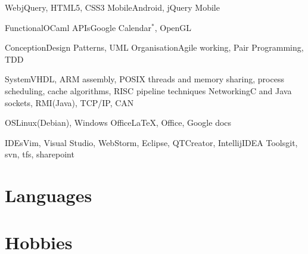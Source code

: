 \documentclass[a4paper,11pt]{moderncv}
\begin{document}
\cvdoubleitem
{Web}{jQuery, HTML5, CSS3}
{Mobile}{Android, jQuery Mobile}

\cvdoubleitem
{Functional}{OCaml}
{APIs}{Google Calendar$^*$, OpenGL}

\cvdoubleitem
{Conception}{Design Patterns, UML}
{Organisation}{Agile working, Pair Programming, TDD}

\cvdoubleitem
{System}{VHDL, ARM assembly, POSIX threads and memory sharing, process scheduling, cache algorithms, RISC pipeline techniques}
{Networking}{C and Java sockets, RMI(Java), TCP/IP, CAN}

\cvdoubleitem
{OS}{Linux(Debian), Windows}
{Office}{LaTeX, Office, Google docs}

\cvdoubleitem
{IDEs}{Vim, Visual Studio, WebStorm, Eclipse, QTCreator, IntellijIDEA}
{Tools}{git, svn, tfs, sharepoint}



\section{Languages}


\section{Hobbies}
\end{document}
